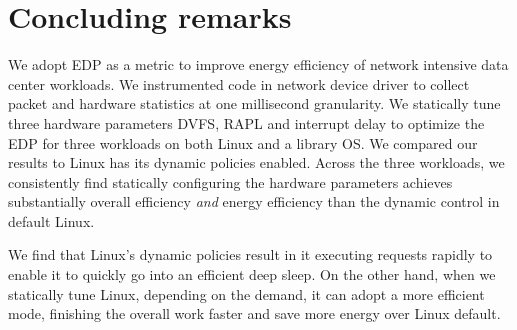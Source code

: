 \section{Concluding remarks}


We adopt EDP as a metric to improve energy efficiency of network intensive data center workloads. We instrumented code in network device driver to collect packet and hardware statistics at one millisecond granularity. 
We statically tune three hardware parameters DVFS, RAPL and interrupt delay to optimize the EDP for three workloads on both Linux and a library OS. We compared our results to Linux has its dynamic policies enabled. Across the three workloads, we consistently find statically configuring the hardware parameters achieves substantially overall efficiency {\em and} energy efficiency than the dynamic control in default Linux.





We find that Linux's dynamic policies result in it executing requests rapidly to enable it to quickly go into an efficient deep sleep.
On the other hand, when we statically tune Linux, depending on the demand, it 
can adopt a more efficient mode, finishing the overall work faster and save more energy over Linux default.

